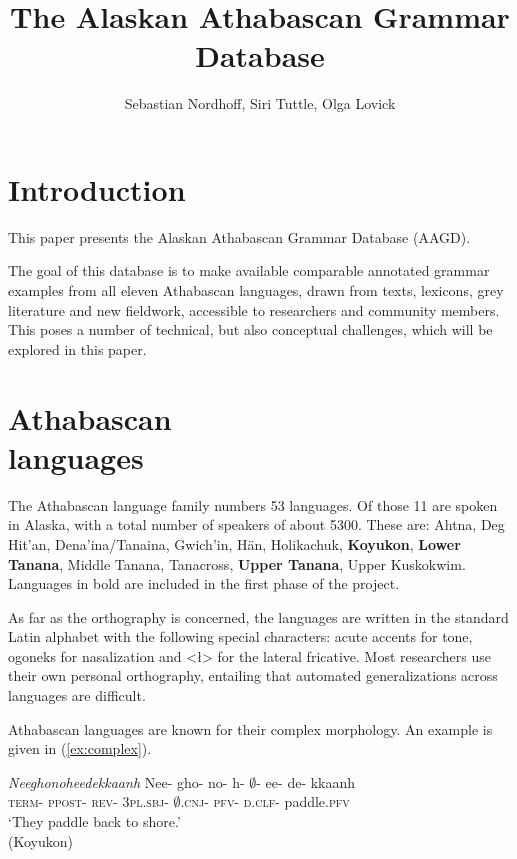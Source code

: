 \documentclass[a4paper,11pt]{article}
\title{The Alaskan Athabascan Grammar Database}
\author{Sebastian Nordhoff, Siri Tuttle, Olga Lovick}
\begin{document}
\twocolumn
\maketitle
\section{Introduction}

This paper presents the Alaskan Athabascan Grammar Database (AAGD). 

The goal of this database is to make available comparable annotated grammar examples from all eleven Athabascan languages, drawn from texts, lexicons, grey literature and new fieldwork, accessible to researchers and community members. This poses a number of technical, but also conceptual challenges, which will be explored in this paper. 


\section{Athabascan\\languages}
The Athabascan language family numbers 53 languages. Of those 11 are spoken in Alaska, with a total number of speakers of about 5300. These are:
Ahtna, 
Deg Hit’an, 
Dena’ina/Ta\-nai\-na, 
Gwich\-’in,
Hän, 
Holi\-ka\-chuk, 
\textbf{Koyukon}, 
\textbf{Lower Tanana}, 
Middle Tanana, 
Tanacross, 
\textbf{Upper Tanana}, 
Upper Kus\-ko\-kwim.	
Languages in bold are included in the first phase of the project.


As far as the orthography is concerned, the languages are written in the standard Latin alphabet with the following special characters: acute accents for tone, ogoneks for nasalization and <ł> for the lateral fricative. Most researchers use their own personal orthography, entailing that automated generalizations across languages are difficult. 


Athabascan languages are known for their complex morphology. An example is given in (\ref{ex:complex}). 

\ea\label{ex:complex}
{\itshape Neeghonoheedekkaanh}
\gll Nee- gho- no- h- {$\emptyset$}- ee- de- kkaanh\\
\textsc{term}- \textsc{ppost}- \textsc{rev}- \textsc{3pl.sbj}- \textsc{{$\emptyset$}.cnj}- \textsc{pfv}- \textsc{d.clf}- paddle.\textsc{pfv}\\
\glt `They paddle back to shore.'\\
(Koyukon)
\z

\end{document}
